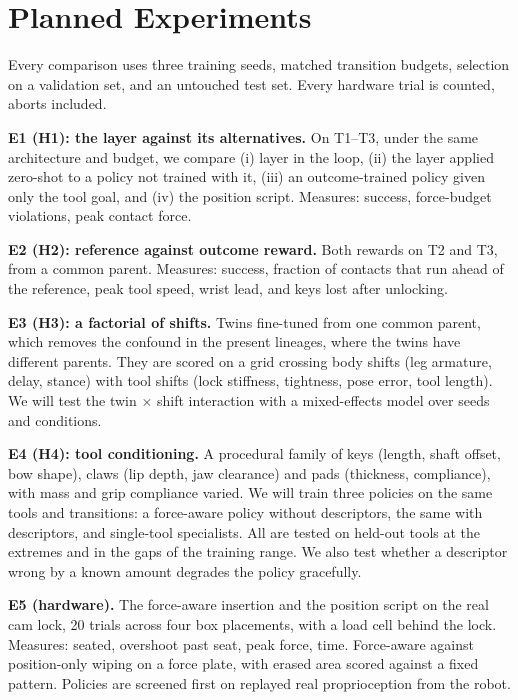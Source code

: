 \documentclass[conference]{IEEEtran}
\newcommand{\hyp}[1]{\textbf{H#1}}
\begin{document}
\section{Planned Experiments}
\label{sec:plan}

Every comparison uses three training seeds, matched transition budgets, selection on a validation set, and an untouched
test set. Every hardware trial is counted, aborts included.

\textbf{E1 (\hyp{1}): the layer against its alternatives.} On T1--T3, under the same architecture and budget, we compare
(i) layer in the loop, (ii) the layer applied zero-shot to a policy not trained with it, (iii) an outcome-trained policy
given only the tool goal, and (iv) the position script. Measures: success, force-budget violations, peak contact force.

\textbf{E2 (\hyp{2}): reference against outcome reward.} Both rewards on T2 and T3, from a common parent. Measures:
success, fraction of contacts that run ahead of the reference, peak tool speed, wrist lead, and keys lost after unlocking.

\textbf{E3 (\hyp{3}): a factorial of shifts.} Twins fine-tuned from one common parent, which removes the confound in the
present lineages, where the twins have different parents. They are scored on a grid crossing body shifts (leg armature,
delay, stance) with tool shifts (lock stiffness, tightness, pose error, tool length). We will test the twin $\times$ shift
interaction with a mixed-effects model over seeds and conditions.

\textbf{E4 (\hyp{4}): tool conditioning.} A procedural family of keys (length, shaft offset, bow shape), claws (lip depth,
jaw clearance) and pads (thickness, compliance), with mass and grip compliance varied. We will train three policies on
the same tools and transitions: a force-aware policy without descriptors, the same with descriptors, and single-tool
specialists. All are tested on held-out tools at the extremes and in the gaps of the training range. We also test
whether a descriptor wrong by a known amount degrades the policy gracefully.

\textbf{E5 (hardware).} The force-aware insertion and the position script on the real cam lock, 20 trials across four
box placements, with a load cell behind the lock. Measures: seated, overshoot past seat, peak force, time. Force-aware
against position-only wiping on a force plate, with erased area scored against a fixed pattern. Policies are screened
first on replayed real proprioception from the robot.
\end{document}
